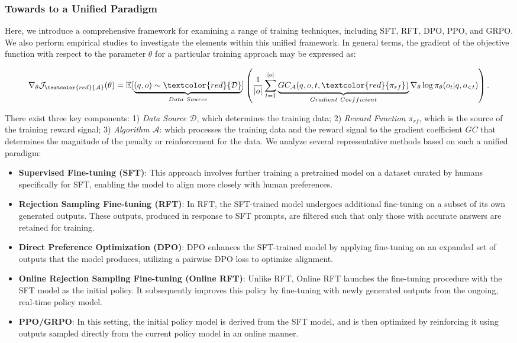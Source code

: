 \begin{itemize}[topsep=0pt]
\begin{itemize}[topsep=0pt]
\subsubsection{Towards to a Unified Paradigm} Here, we introduce a comprehensive framework for examining a range of training techniques, including SFT, RFT, DPO, PPO, and GRPO. We also perform empirical studies to investigate the elements within this unified framework. In general terms, the gradient of the objective function with respect to the parameter $\theta$ for a particular training approach may be expressed as:

\begin{equation}
    \nabla_{\theta}\mathcal{J}_{\textcolor{red}{\mathcal{A}}}(\theta) = \mathbb{E}[\underbrace{(q,o) \sim \textcolor{red}{\mathcal{D}}}_{Data \ Source}]\left( \frac{1}{|o|} \sum_{t=1}^{|o|}  \underbrace{GC_{{\mathcal{A}}}(q, o, t, \textcolor{red}{\pi_{{rf}}})}_{Gradient \ Coefficient}  \nabla_{\theta}\log \pi_{\theta}(o_t | q, o_{<t})\right).
\label{eq:objective}
\end{equation}

There exist three key components: 1) \textit{Data Source $\mathcal{D}$}, which determines the training data; 2) \textit{Reward Function $\pi_{{rf}}$}, which is the source of the training reward signal; 3) \textit{Algorithm $\mathcal{A}$}: which processes the training data and the reward signal to the gradient coefficient $GC$ that determines the magnitude of the penalty or reinforcement for the data. We analyze several representative methods based on such a unified paradigm:

\begin{itemize}
    \item \textbf{Supervised Fine-tuning (SFT)}: This approach involves further training a pretrained model on a dataset curated by humans specifically for SFT, enabling the model to align more closely with human preferences.
    \item \textbf{Rejection Sampling Fine-tuning (RFT)}: In RFT, the SFT-trained model undergoes additional fine-tuning on a subset of its own generated outputs. These outputs, produced in response to SFT prompts, are filtered such that only those with accurate answers are retained for training.
    \item \textbf{Direct Preference Optimization (DPO)}: DPO enhances the SFT-trained model by applying fine-tuning on an expanded set of outputs that the model produces, utilizing a pairwise DPO loss to optimize alignment.
    \item \textbf{Online Rejection Sampling Fine-tuning (Online RFT)}: Unlike RFT, Online RFT launches the fine-tuning procedure with the SFT model as the initial policy. It subsequently improves this policy by fine-tuning with newly generated outputs from the ongoing, real-time policy model.
    \item \textbf{PPO/GRPO}: In this setting, the initial policy model is derived from the SFT model, and is then optimized by reinforcing it using outputs sampled directly from the current policy model in an online manner.
\end{itemize}


\end{itemize}
\end{itemize}
